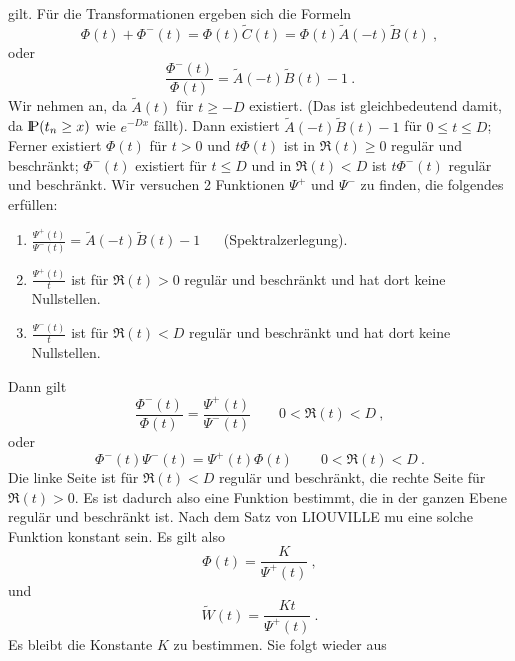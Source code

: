 gilt. Für die Transformationen ergeben sich die Formeln
\begin{displaymath}
\Phi (t) + \Phi^{-}(t) = \Phi (t) \tilde C (t) = \Phi (t) \tilde A (-t)
\tilde B (t) ~,
\end{displaymath}
oder
\begin{displaymath}
\frac{\Phi^{-}(t)}{\Phi (t)} = \tilde A (-t)  \tilde B (t) -1 ~.
\end{displaymath}
Wir nehmen an, da\3 $\tilde A(t)$ für $t \geq -D$ existiert. (Das ist
gleichbedeutend damit, da\3 ${\rm I\kern-0.2em P} (t_{n} \geq x)$ wie $e^{-Dx}$ fällt).
Dann existiert $\tilde A (-t) \tilde B (t) - 1$ für $0 \leq t \leq D$;
Ferner existiert $\Phi (t)$ für $t >0$ und $t \Phi (t)$ ist in $\Re (t)
\geq 0$ regulär und beschränkt; $\Phi^{-}(t)$ existiert für $t \leq D$
und in $\Re (t) < D$ ist $t\Phi^{-}(t)$ regulär und beschränkt. Wir
versuchen 2 Funktionen $\Psi^{+}$ und $\Psi^{-}$ zu finden, die folgendes
erfüllen:
\begin{enumerate}
\item $\frac{\Psi^{+}(t)}{\Psi^{-}(t)} = \tilde A(-t) \tilde B(t) -1$ ~ ~(Spektralzerlegung).
\item $\frac{\Psi^{+}(t)}{t}$ ist für $\Re(t)>0$ regulär und beschränkt
und hat dort keine Nullstellen.
\item $\frac{\Psi^{-}(t)}{t}$ ist für $\Re (t) < D$ regulär und
beschränkt und hat dort keine Nullstellen.
\end{enumerate}
Dann gilt
\begin{displaymath}
\frac{\Phi^{-}(t)}{\Phi (t)} = \frac{\Psi^{+}(t)}{\Psi^{-}(t)} \qquad
0< \Re (t) < D ~,
\end{displaymath}
oder
\begin{displaymath}
\Phi^{-}(t) \Psi^{-}(t) = \Psi^{+}(t) \Phi (t) \qquad 0< \Re (t) < D ~.
\end{displaymath}
Die linke Seite ist für $\Re (t) < D$ regulär und beschränkt, die
rechte Seite für $\Re (t) > 0$. Es ist dadurch also eine Funktion
bestimmt, die in der ganzen Ebene regulär und beschränkt ist. Nach dem
Satz von LIOUVILLE mu\3 eine solche Funktion konstant sein. Es gilt also
\begin{displaymath}
\Phi (t) = \frac{K}{\Psi^{+}(t)} ~,
\end{displaymath}
und
\begin{displaymath}
\tilde W (t) =  \frac{Kt}{\Psi^{+}(t)} ~.
\end{displaymath}
Es bleibt die Konstante $K$ zu bestimmen. Sie folgt wieder aus
